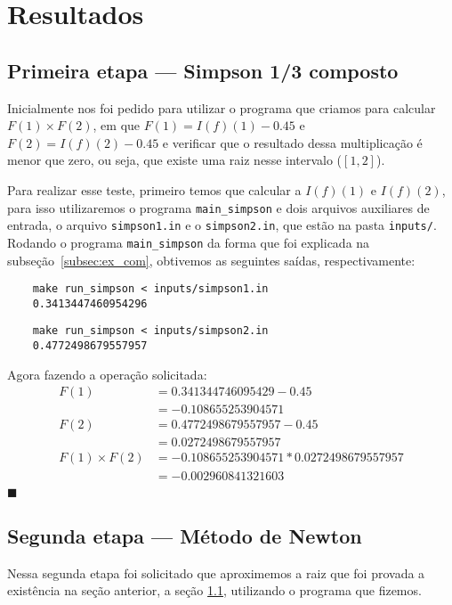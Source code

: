 \chapter{Resultados}
\section{Primeira etapa --- Simpson 1/3 composto}
\label{sec:resultadoSimpson}
Inicialmente nos foi pedido para utilizar o programa que criamos para calcular
\(F(1)\times F(2)\), em que \(F(1) = I(f)(1) - 0.45\) e  \(F(2) = I(f)(2) -
0.45\) e verificar que o resultado dessa multiplicação é menor que zero, ou
seja, que existe uma raiz nesse intervalo (\([1, 2]\)).

Para realizar esse teste, primeiro temos que calcular a \(I(f)(1)\) e
\(I(f)(2)\), para isso utilizaremos o programa \texttt{main\_simpson} e dois
arquivos auxiliares de entrada, o arquivo \texttt{simpson1.in} e o
\texttt{simpson2.in}, que estão na pasta \texttt{inputs/}. Rodando o programa
\texttt{main\_simpson} da forma que foi explicada na
subseção~\ref{subsec:ex_com}, obtivemos as seguintes saídas, respectivamente:

\begin{verbatim}
	make run_simpson < inputs/simpson1.in
	0.3413447460954296
\end{verbatim}

\begin{verbatim}
	make run_simpson < inputs/simpson2.in
	0.4772498679557957
\end{verbatim}

Agora fazendo a operação solicitada:
\begin{align*}
F(1) &= 0.341344746095429 - 0.45\\
     &= -0.108655253904571\\
F(2) &= 0.4772498679557957 - 0.45\\
     &= 0.0272498679557957\\
F(1) \times F(2) &= -0.108655253904571 * 0.0272498679557957\\
                 &= -0.002960841321603\\
\end{align*}
\hfill\(\blacksquare\)

\section{Segunda etapa --- Método de Newton}
Nessa segunda etapa foi solicitado que aproximemos a raiz que foi provada a
existência na seção anterior, a seção \ref{sec:resultadoSimpson}, utilizando o
programa que fizemos.

